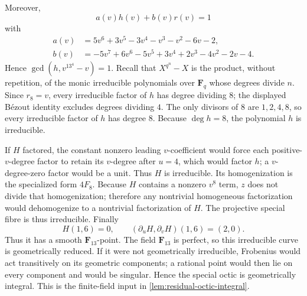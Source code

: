 Moreover,
\[
 a(v)h(v)+b(v)r(v)=1
\]
with
\begin{align*}
a(v)&=5v^6+3v^5-3v^4-v^3-v^2-6v-2,\\
b(v)&=-5v^7+6v^6-5v^5+3v^4+2v^3-4v^2-2v-4.
\end{align*}
Hence $\gcd(h,v^{13^4}-v)=1$.  Recall that
$X^{q^n}-X$ is the product, without repetition, of the monic irreducible
polynomials over $\mathbf F_q$ whose degrees divide $n$.  Since $r_8=v$,
every irreducible factor of $h$ has degree dividing $8$; the displayed
B\'ezout identity excludes degrees dividing $4$.  The only divisors of $8$
are $1,2,4,8$, so every irreducible factor of $h$ has degree $8$.  Because
$\deg h=8$, the polynomial $h$ is irreducible.

If $H$ factored, the constant nonzero leading $v$-coefficient would force
each positive-$v$-degree factor to retain its $v$-degree after $u=4$, which
would factor $h$; a $v$-degree-zero factor would be a unit.  Thus $H$ is
irreducible.  Its homogenization is the specialized form $4F_8$.  Because
$H$ contains a nonzero $v^8$ term, $z$ does not divide that homogenization;
therefore any nontrivial homogeneous factorization would dehomogenize to a
nontrivial factorization of $H$.  The projective special fibre is thus
irreducible.  Finally
\[
 H(1,6)=0,
 \qquad
 (\partial_uH,\partial_vH)(1,6)=(2,0).
\]
Thus it has a smooth $\mathbf F_{13}$-point.  The field $\mathbf F_{13}$ is
perfect, so this irreducible curve is geometrically reduced.  If it were not
geometrically irreducible, Frobenius would act transitively on its geometric
components; a rational point would then lie on every component and would be
singular.  Hence the special octic is geometrically integral.  This is the
finite-field input in \cref{lem:residual-octic-integral}.
